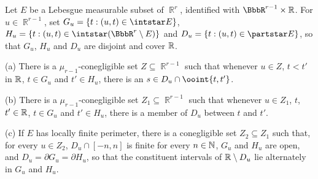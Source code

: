 
 Let $E$ be a Lebesgue measurable subset of
$\BbbR^r$, identified with $\BbbR^{r-1}\times\Bbb R$.
For $u\in\BbbR^{r-1}$, set $G_u=\{t:(u,t)\in\intstar E\}$,
$H_u=\{t:(u,t)\in\intstar(\BbbR^r\setminus E)\}$ and
$D_u=\{t:(u,t)\in\partstar E\}$, so that $G_u$, $H_u$ and $D_u$ are
disjoint and cover $\Bbb R$.

(a) There is a
$\mu_{r-1}$-conegligible set $Z\subseteq\BbbR^{r-1}$ such that whenever
$u\in Z$, $t<t'$ in $\Bbb R$, $t\in G_u$ and
$t'\in H_u$, there is an $s\in D_u\cap\ooint{t,t'}$.

(b) There is a
$\mu_{r-1}$-conegligible set $Z_1\subseteq\BbbR^{r-1}$ such that whenever
$u\in Z_1$, $t$, $t'\in\Bbb R$, $t\in G_u$ and
$t'\in H_u$, there is a member of $D_u$ between $t$ and $t'$.

(c) If $E$ has locally finite perimeter, there is a conegligible set
$Z_2\subseteq Z_1$ such that,
for every $u\in Z_2$, $D_u\cap[-n,n]$ is finite for every $n\in\Bbb N$,
$G_u$ and $H_u$ are open, and $D_u=\partial G_u=\partial H_u$, so that
the constituent intervals of $\Bbb R\setminus D_u$ lie alternately in
$G_u$ and $H_u$.

